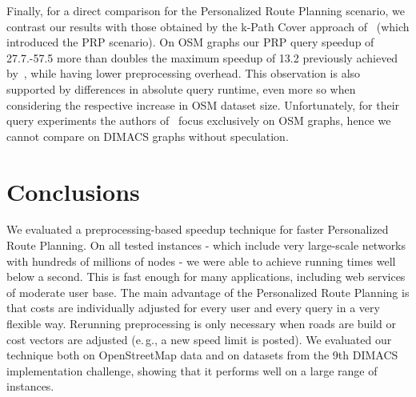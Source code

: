 \documentclass{sig-alternate}
\newcommand{\eg}{e.\,g.\xspace}
\begin{document}
Finally, for a direct comparison for the Personalized Route Planning scenario, we contrast our results with those obtained by the k-Path Cover approach of~\cite{fns-opca-14} (which introduced the PRP scenario). 
On OSM graphs our PRP query speedup of 27.7.-57.5 more than doubles the maximum speedup of 13.2 previously achieved by~\cite{fns-opca-14}, while having lower preprocessing overhead. This observation is also supported by differences in absolute query runtime, even more so when considering the respective increase in OSM dataset size. Unfortunately, for their query experiments the authors of~\cite{fns-opca-14} focus exclusively on OSM graphs, hence we cannot compare on DIMACS graphs without speculation.

\section{Conclusions}We evaluated a preprocessing-based speedup technique for faster Personalized Route Planning. 
On all tested instances - which include very large-scale networks with hundreds of millions of nodes - we were able to achieve running times well below a second.
This is fast enough for many applications, including web services of moderate user base.
The main advantage of the Personalized Route Planning is that costs are individually adjusted for every user and every query in a very flexible way.
Rerunning preprocessing is only necessary when roads are build or cost vectors are adjusted (\eg, a new speed limit is posted).
We evaluated our technique both on OpenStreetMap data and on datasets from the 9th DIMACS implementation challenge, showing that it performs well on a large range of instances.
\end{document}
